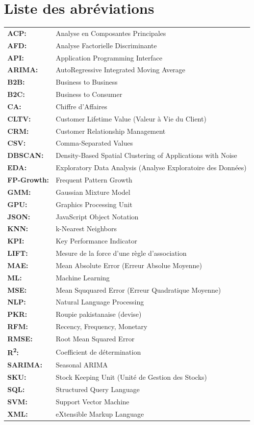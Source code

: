 \documentclass[a4paper,12pt]{article}
\begin{document}
\chapter*{Liste des abréviations}
\vspace{1cm}
    
\begin{tabular}{@{} l l} %
\textbf{ACP:} & Analyse en Composantes Principales \\
\textbf{AFD:} & Analyse Factorielle Discriminante \\
\textbf{API:} & Application Programming Interface \\
\textbf{ARIMA:} & AutoRegressive Integrated Moving Average \\
\textbf{B2B:} & Business to Business \\
\textbf{B2C:} & Business to Consumer \\
\textbf{CA:} & Chiffre d'Affaires \\
\textbf{CLTV:} & Customer Lifetime Value (Valeur à Vie du Client) \\
\textbf{CRM:} & Customer Relationship Management \\
\textbf{CSV:} & Comma-Separated Values \\
\textbf{DBSCAN:} & Density-Based Spatial Clustering of Applications with Noise \\
\textbf{EDA:} & Exploratory Data Analysis (Analyse Exploratoire des Données) \\
\textbf{FP-Growth:} & Frequent Pattern Growth \\
\textbf{GMM:} & Gaussian Mixture Model \\
\textbf{GPU:} & Graphics Processing Unit \\
\textbf{JSON:} & JavaScript Object Notation \\
\textbf{KNN:} & k-Nearest Neighbors \\
\textbf{KPI:} & Key Performance Indicator \\
\textbf{LIFT:} & Mesure de la force d'une règle d'association \\
\textbf{MAE:} & Mean Absolute Error (Erreur Absolue Moyenne) \\
\textbf{ML:} & Machine Learning \\
\textbf{MSE:} & Mean Sququared Error (Erreur Quadratique Moyenne) \\
\textbf{NLP:} & Natural Language Processing \\
\textbf{PKR:} & Roupie pakistanaise (devise) \\
\textbf{RFM:} & Recency, Frequency, Monetary \\
\textbf{RMSE:} & Root Mean Squared Error \\
\textbf{R\textsuperscript{2}:} & Coefficient de détermination \\
\textbf{SARIMA:} & Seasonal ARIMA \\
\textbf{SKU:} & Stock Keeping Unit (Unité de Gestion des Stocks) \\
\textbf{SQL:} & Structured Query Language \\
\textbf{SVM:} & Support Vector Machine \\
\textbf{XML:} & eXtensible Markup Language
\end{tabular}
\end{document}
